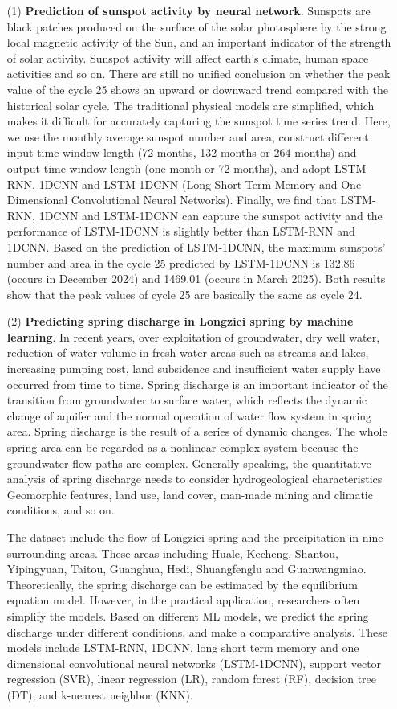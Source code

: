 \begin{enumerate}

  \item[(1)] \textbf{Prediction of sunspot activity by neural network}. Sunspots are black patches produced on the surface of the solar photosphere by the strong local magnetic activity of the Sun, and an important indicator of the strength of solar activity. Sunspot activity will affect earth's climate, human space activities and so on. There are still no unified conclusion on whether the peak value of the cycle 25 shows an upward or downward trend compared with the historical solar cycle. The traditional physical models are simplified, which makes it difficult for accurately capturing the sunspot time series trend. Here, we use the monthly average sunspot number and area, construct different input time window length (72 months, 132 months or 264 months) and output time window length (one month or 72 months), and adopt LSTM-RNN, 1DCNN and LSTM-1DCNN (Long Short-Term Memory and One Dimensional Convolutional Neural Networks). Finally, we find that LSTM-RNN, 1DCNN and LSTM-1DCNN can capture the sunspot activity and the performance of LSTM-1DCNN is slightly better than LSTM-RNN and 1DCNN. Based on the prediction of LSTM-1DCNN, the maximum sunspots' number and area in the cycle 25 predicted by LSTM-1DCNN is 132.86 (occurs in December 2024) and 1469.01 (occurs in March 2025). Both results show that the peak values of cycle 25 are basically the same as cycle 24. 

  \item[(2)] \textbf{Predicting spring discharge in Longzici spring by machine learning}. In recent years, over exploitation of groundwater, dry well water, reduction of water volume in fresh water areas such as streams and lakes, increasing pumping cost, land subsidence and insufficient water supply have occurred from time to time. Spring discharge is an important indicator of the transition from groundwater to surface water, which reflects the dynamic change of aquifer and the normal operation of water flow system in spring area. Spring discharge is the result of a series of dynamic changes. The whole spring area can be regarded as a nonlinear complex system because the groundwater flow paths are complex. Generally speaking, the quantitative analysis of spring discharge needs to consider hydrogeological characteristics Geomorphic features, land use, land cover, man-made mining and climatic conditions, and so on.
  
  The dataset include the flow of Longzici spring and the precipitation in nine surrounding areas. These areas including Huale, Kecheng, Shantou, Yipingyuan, Taitou, Guanghua, Hedi, Shuangfenglu and Guanwangmiao. Theoretically, the spring discharge can be estimated by the equilibrium equation model. However, in the practical application, researchers often simplify the models. Based on different ML models, we predict the spring discharge under different conditions, and make a comparative analysis. These models include LSTM-RNN, 1DCNN, long short term memory and one dimensional convolutional neural networks (LSTM-1DCNN), support vector regression (SVR), linear regression (LR), random forest (RF), decision tree (DT), and k-nearest neighbor (KNN).


\end{enumerate}

